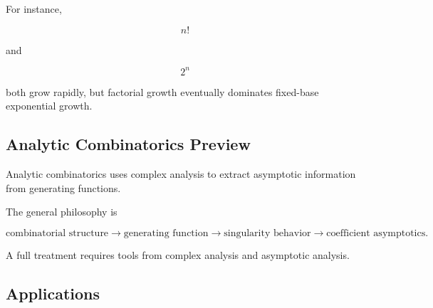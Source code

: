 For instance,

\[
n!
\]

and

\[
2^n
\]

both grow rapidly, but factorial growth eventually dominates fixed-base
exponential growth.

\subsection{Analytic Combinatorics Preview}
\label{subsec:analytic-combinatorics-preview}

Analytic combinatorics uses complex analysis to extract asymptotic
information from generating functions.

The general philosophy is

\[
\boxed{
\text{combinatorial structure}
\longrightarrow
\text{generating function}
\longrightarrow
\text{singularity behavior}
\longrightarrow
\text{coefficient asymptotics}.
}
\]

A full treatment requires tools from complex analysis and asymptotic
analysis.

\subsection{Applications}
\label{subsec:enumerative-combinatorics-applications}

